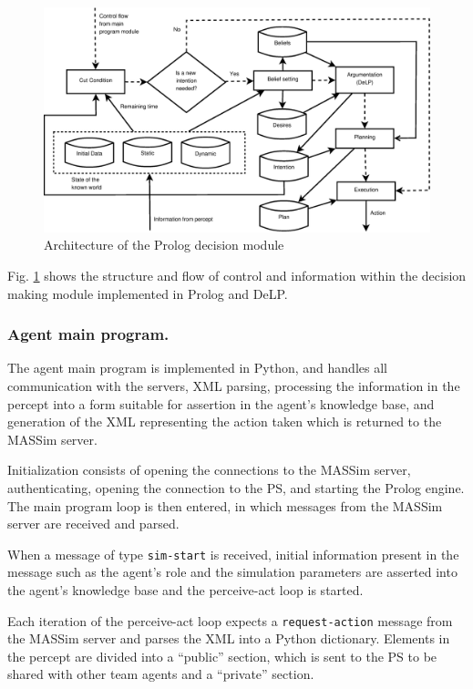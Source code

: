     \begin{figure}[!htb]
    \centering
    \includegraphics[width=\textwidth]{agentprolog.eps}
    \caption{Architecture of the Prolog decision module}
    \label{fig:prologmodule}
    \end{figure}

    Fig. \ref{fig:prologmodule} shows the structure and flow of control and
    information within the decision making module implemented in Prolog and
    DeLP.
    
\subsubsection{Agent main program.}
    The agent main program is implemented in Python, and handles all
    communication with the servers, XML parsing, processing the information in
    the percept into a form suitable for assertion in the agent's knowledge
    base, and generation of the XML representing the action taken which is
    returned to the MASSim server.

    Initialization consists of opening the connections to the MASSim server,
    authenticating, opening the connection to the PS, and starting
    the Prolog engine. The main program loop is then entered, in which messages
    from the MASSim server are received and parsed. 

    When a message of type \texttt{sim-start} is received, initial information
    present in the message such as the agent's role and the simulation
    parameters are asserted into the agent's knowledge base and the perceive-act
    loop is started.

    Each iteration of the perceive-act loop expects a \texttt{request-action}
    message from the MASSim server and parses the XML into a Python dictionary.
    Elements in the percept are divided into a ``public'' section, which is sent
    to the PS to be shared with other team agents and a ``private''
    section.

